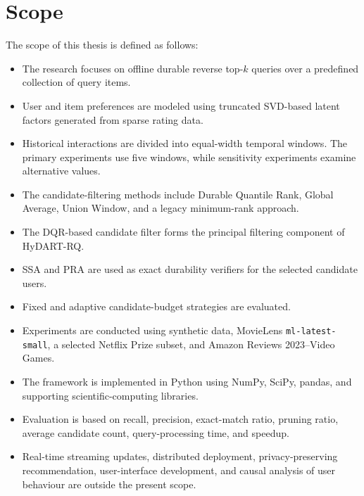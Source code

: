 
\section{Scope}
\label{sec:scope}

The scope of this thesis is defined as follows:

\begin{itemize}

\item The research focuses on offline durable reverse top-$k$ queries over a predefined collection of query items.

\item User and item preferences are modeled using truncated SVD-based latent factors generated from sparse rating data.

\item Historical interactions are divided into equal-width temporal windows. The primary experiments use five windows, while sensitivity experiments examine alternative values.

\item The candidate-filtering methods include Durable Quantile Rank, Global Average, Union Window, and a legacy minimum-rank approach.

\item The DQR-based candidate filter forms the principal filtering component of HyDART-RQ.

\item SSA and PRA are used as exact durability verifiers for the selected candidate users.

\item Fixed and adaptive candidate-budget strategies are evaluated.

\item Experiments are conducted using synthetic data, MovieLens \texttt{ml\allowbreak-latest\allowbreak-small}, a selected Netflix Prize subset, and Amazon Reviews 2023--Video Games.

\item The framework is implemented in Python using NumPy, SciPy, pandas, and supporting scientific-computing libraries.

\item Evaluation is based on recall, precision, exact-match ratio, pruning ratio, average candidate count, query-processing time, and speedup.

\item Real-time streaming updates, distributed deployment, privacy-preserving recommendation, user-interface development, and causal analysis of user behaviour are outside the present scope.

\end{itemize}

